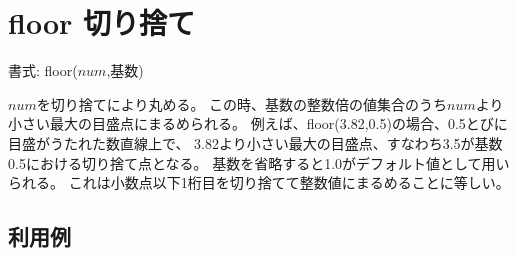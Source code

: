 
%

\section{floor 切り捨て\label{sect:floor}}

書式: floor($num$,基数)

$num$を切り捨てにより丸める。
この時、基数の整数倍の値集合のうち$num$より小さい最大の目盛点にまるめられる。
例えば、floor(3.82,0.5)の場合、0.5とびに目盛がうたれた数直線上で、
3.82より小さい最大の目盛点、すなわち3.5が基数0.5における切り捨て点となる。
基数を省略すると1.0がデフォルト値として用いられる。
これは小数点以下1桁目を切り捨てて整数値にまるめることに等しい。

\subsection*{利用例}


%
